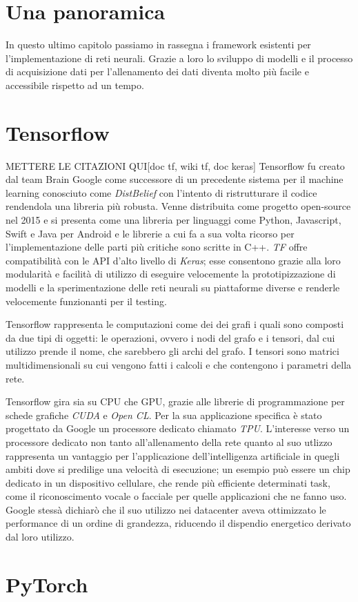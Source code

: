 \section*{Una panoramica}
In questo ultimo capitolo passiamo in rassegna i framework esistenti per l'implementazione di reti neurali. Grazie a loro  lo sviluppo di modelli e il processo di acquisizione dati per l'allenamento dei dati diventa molto più facile e accessibile rispetto ad un tempo. 
\section*{Tensorflow}
METTERE LE CITAZIONI QUI[doc tf, wiki tf, doc keras]
Tensorflow  fu creato dal team Brain Google come successore di un precedente sistema per il machine learning conosciuto come \textit{DistBelief} con l'intento di ristrutturare il codice rendendola una libreria più robusta. Venne distribuita come progetto open-source nel 2015 e si presenta come una libreria per linguaggi come Python, Javascript, Swift e Java per Android  e le librerie a cui fa a sua volta ricorso per l'implementazione delle parti più critiche sono scritte in C++. \textit{TF} offre compatibilità con le API d'alto livello di \textit{Keras}; esse consentono grazie alla loro modularità e facilità di utilizzo di eseguire velocemente la prototipizzazione di modelli e la sperimentazione delle reti neurali su piattaforme diverse e renderle velocemente funzionanti per il testing.

Tensorflow rappresenta le computazioni come dei dei grafi i quali sono composti da due tipi di oggetti: le operazioni, ovvero i nodi del grafo e i tensori, dal cui utilizzo prende il nome, che sarebbero gli archi del grafo.
I tensori sono matrici multidimensionali su cui vengono fatti i calcoli e che contengono i parametri della rete.

Tensorflow gira sia su CPU che GPU, grazie alle librerie di programmazione per schede grafiche \textit{CUDA} e \textit{Open CL}. Per la sua applicazione specifica è stato progettato da Google un processore dedicato chiamato \textit{TPU}. L'interesse verso un processore dedicato non tanto all'allenamento della rete quanto al suo utlizzo rappresenta un vantaggio per l'applicazione dell'intelligenza artificiale in quegli ambiti dove si predilige una velocità di esecuzione; un esempio può essere un chip dedicato in un dispositivo cellulare, che rende più efficiente determinati task, come il riconoscimento vocale o facciale per quelle applicazioni che ne fanno uso. Google stessà dichiarò che il suo utilizzo nei datacenter aveva ottimizzato le performance di un ordine di grandezza, riducendo il dispendio energetico derivato dal loro utilizzo. 

\section*{PyTorch}
